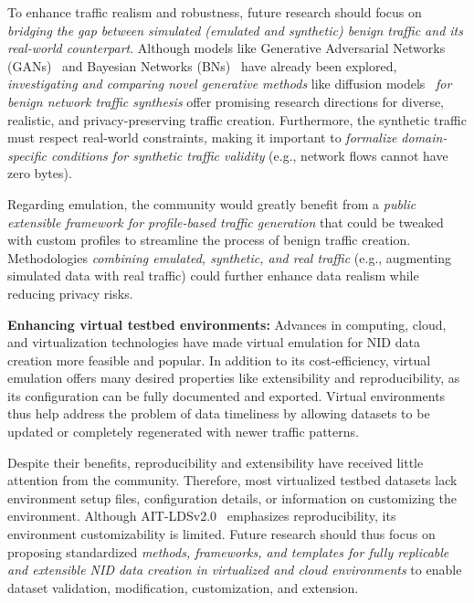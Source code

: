 To enhance traffic realism and robustness, future research should focus on \emph{bridging the gap between simulated (emulated and synthetic) benign traffic and its real-world counterpart}. Although models like Generative Adversarial Networks (GANs)~\cite{ring2019_flowbased_generation_gans} and Bayesian Networks (BNs)~\cite{schoen2024_tale_two_methods} have already been explored, \emph{investigating and comparing novel generative methods} like diffusion models~\cite{yang2023_diffusion_models_survey} \emph{for benign network traffic synthesis} offer promising research directions for diverse, realistic, and privacy-preserving traffic creation. Furthermore, the synthetic traffic must respect real-world constraints, making it important to \emph{formalize domain-specific conditions for synthetic traffic validity} (e.g., network flows cannot have zero bytes).

Regarding emulation, the community would greatly benefit from a \emph{public extensible framework for profile-based traffic generation} that could be tweaked with custom profiles to streamline the process of benign traffic creation. Methodologies \emph{combining emulated, synthetic, and real traffic} (e.g., augmenting simulated data with real traffic) could further enhance data realism while reducing privacy risks.

\textbf{Enhancing virtual testbed environments:} Advances in computing, cloud, and virtualization technologies have made virtual emulation for NID data creation more feasible and popular. In addition to its cost-efficiency, virtual emulation offers many desired properties like extensibility and reproducibility, as its configuration can be fully documented and exported. Virtual environments thus help address the problem of data timeliness by allowing datasets to be updated or completely regenerated with newer traffic patterns.

Despite their benefits, reproducibility and extensibility have received little attention from the community. Therefore, most virtualized testbed datasets lack environment setup files, configuration details, or information on customizing the environment. Although AIT-LDSv2.0~\cite{landauer2023_ait_ldsv2_dataset} emphasizes reproducibility, its environment customizability is limited. Future research should thus focus on proposing standardized \emph{methods, frameworks, and templates for fully replicable and extensible NID data creation in virtualized and cloud environments} to enable dataset validation, modification, customization, and extension.

